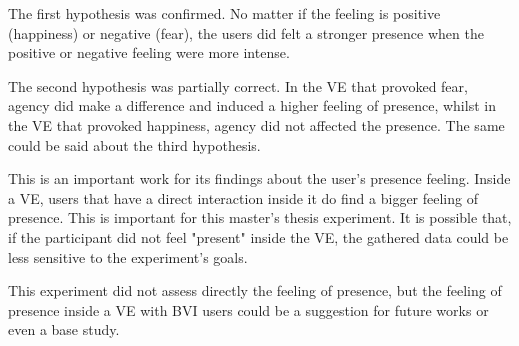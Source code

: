 The first hypothesis was confirmed. No matter if the feeling is positive (happiness) or negative (fear), the users did felt a stronger presence when the positive or negative feeling were more intense.

The second hypothesis was partially correct. In the VE that provoked fear, agency did make a difference and induced a higher feeling of presence, whilst in the VE that provoked happiness, agency did not affected the presence. The same could be said about the third hypothesis.

This is an important work for its findings about the user's presence feeling. Inside a VE, users that have a direct interaction inside it do find a bigger feeling of presence. This is important for this master's thesis experiment. It is possible that, if the participant did not feel "present" inside the VE, the gathered data could be less sensitive to the experiment's goals.

This experiment did not assess directly the feeling of presence, but the feeling of presence inside a VE with BVI users could be a suggestion for future works or even a base study.

